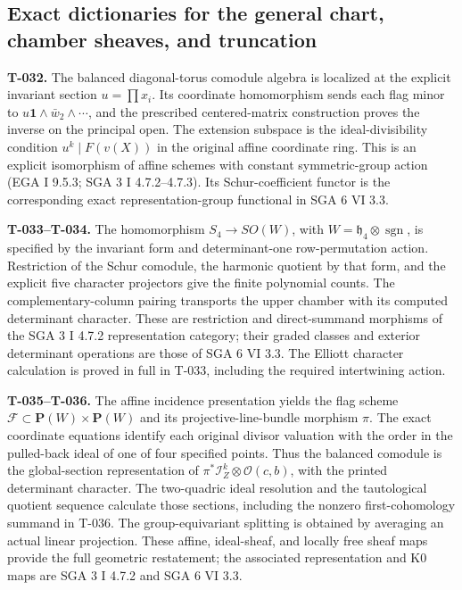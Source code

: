 \documentclass[
  10pt,
]{article}
\begin{document}
\subsection{Exact dictionaries for the general chart, chamber sheaves,
and
truncation}\label{exact-dictionaries-for-the-general-chart-chamber-sheaves-and-truncation}

\textbf{T-032.} The balanced diagonal-torus comodule algebra is
localized at the explicit invariant section \(u=\prod x_i\). Its
coordinate homomorphism sends each flag minor to
\(u\mathbf1\wedge\bar w_2\wedge\cdots\), and the prescribed
centered-matrix construction proves the inverse on the principal open.
The extension subspace is the ideal-divisibility condition
\(u^k\mid F(v(X))\) in the original affine coordinate ring. This is an
explicit isomorphism of affine schemes with constant symmetric-group
action (EGA I 9.5.3; SGA 3 I 4.7.2--4.7.3). Its Schur-coefficient
functor is the corresponding exact representation-group functional in
SGA 6 VI 3.3.

\textbf{T-033--T-034.} The homomorphism \(S_4\to SO(W)\), with
\(W=\mathfrak h_4\otimes\operatorname{sgn}\), is specified by the
invariant form and determinant-one row-permutation action. Restriction
of the Schur comodule, the harmonic quotient by that form, and the
explicit five character projectors give the finite polynomial counts.
The complementary-column pairing transports the upper chamber with its
computed determinant character. These are restriction and direct-summand
morphisms of the SGA 3 I 4.7.2 representation category; their graded
classes and exterior determinant operations are those of SGA 6 VI 3.3.
The Elliott character calculation is proved in full in T-033, including
the required intertwining action.

\textbf{T-035--T-036.} The affine incidence presentation yields the flag
scheme \(\mathcal F\subset\mathbf P(W)\times\mathbf P(W)\) and its
projective-line-bundle morphism \(\pi\). The exact coordinate equations
identify each original divisor valuation with the order in the
pulled-back ideal of one of four specified points. Thus the balanced
comodule is the global-section representation of
\(\pi^*\mathcal I_Z^k\otimes\mathcal O(c,b)\), with the printed
determinant character. The two-quadric ideal resolution and the
tautological quotient sequence calculate those sections, including the
nonzero first-cohomology summand in T-036. The group-equivariant
splitting is obtained by averaging an actual linear projection. These
affine, ideal-sheaf, and locally free sheaf maps provide the full
geometric restatement; the associated representation and K0 maps are SGA
3 I 4.7.2 and SGA 6 VI 3.3.
\end{document}
